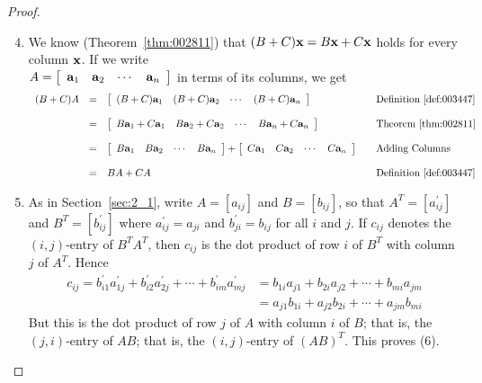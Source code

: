\begin{proof}
\begin{enumerate}
\setcounter{enumi}{3}
\item We know (Theorem~\ref{thm:002811}) that $(B + C)\textbf{x} = B\textbf{x} + C\textbf{x}$ holds for every column $\textbf{x}$. If we write \\ $A = \left[ \begin{array}{rrrr}
\textbf{a}_{1} & \textbf{a}_{2} & \cdots & \textbf{a}_{n}
\end{array} \right]$ in terms of its columns, we get
\begin{equation*}
\begin{array}{lllll}
(B + C)A & = & \left[ \begin{array}{rrrr}
(B + C)\textbf{a}_{1} & (B + C)\textbf{a}_{2} & \cdots & (B + C)\textbf{a}_{n}
\end{array} \right] & & \mbox{Definition~\ref{def:003447}} \\
& & & & \\
& = & \left[ \begin{array}{rrrr}
B\textbf{a}_{1} + C\textbf{a}_{1} & B\textbf{a}_{2} + C\textbf{a}_{2} & \cdots & B\textbf{a}_{n} + C\textbf{a}_{n}
\end{array} \right] & & \mbox{Theorem~\ref{thm:002811}} \\
& & & & \\
& = & \left[ \begin{array}{rrrr}
B\textbf{a}_{1} & B\textbf{a}_{2} & \cdots & B\textbf{a}_{n}
\end{array} \right] + \left[ \begin{array}{rrrr}
C\textbf{a}_{1} & C\textbf{a}_{2} & \cdots & C\textbf{a}_{n}
\end{array} \right] & & \mbox{Adding Columns} \\
& & & & \\
& = & BA + CA & & \mbox{Definition~\ref{def:003447}}
\end{array}
\end{equation*}
\setcounter{enumi}{5}
\item As in Section~\ref{sec:2_1}, write $A = [a_{ij}]$ and $B = [b_{ij}]$, so that $A^{T} = [a^\prime_{ij}]$ and $B^{T} = [b^\prime_{ij}]$ where $a^\prime_{ij} = a_{ji}$ and $b^\prime_{ji} = b_{ij}$ for all $i$ and $j$. If $c_{ij}$ denotes the $(i, j)$-entry of $B^{T}A^{T}$, then $c_{ij}$ is the dot product of row $i$ of $B^{T}$ with column $j$ of $A^{T}$. Hence
\begin{align*}
c_{ij} = b_{i1}^\prime a_{1j}^\prime + b_{i2}^\prime a_{2j}^\prime + \cdots + b_{im}^\prime a_{mj}^\prime  &= b_{1i} a_{j1} + b_{2i} a_{j2} + \cdots + b_{mi} a_{jm} \\
&= a_{j1}b_{1i} + a_{j2}b_{2i} + \cdots + a_{jm}b_{mi} 
\end{align*}
But this is the dot product of row $j$ of $A$ with column $i$ of $B$; that is, the $(j, i)$-entry of $AB$; that is, the $(i, j)$-entry of $(AB)^{T}$. This proves (6).
\end{enumerate}
\vspace*{-2em}
\end{proof}

